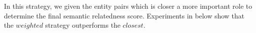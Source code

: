 In this strategy, we given the entity pairs which is closer a more important role to determine the final semantic relatedness
score. Experiments in below show that the $weighted$ strategy outperforms the $closest$.


